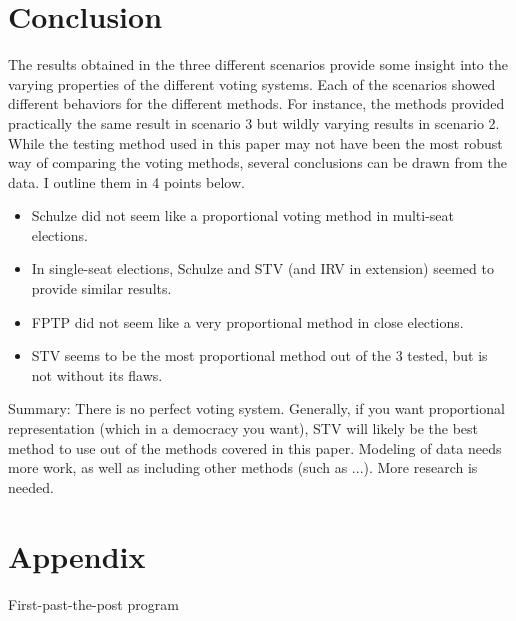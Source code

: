\documentclass[12pt]{article}
\begin{document}
\section{Conclusion}
The results obtained in the three different scenarios provide some insight into the varying properties of the different voting systems. Each of the scenarios showed different behaviors for the different methods. For instance, the methods provided practically the same result in scenario 3 but wildly varying results in scenario 2. While the testing method used in this paper may not have been the most robust way of comparing the voting methods, several conclusions can be drawn from the data. I outline them in 4 points below.
\begin{itemize}
	\item Schulze did not seem like a proportional voting method in multi-seat elections.
	\item In single-seat elections, Schulze and STV (and IRV in extension) seemed to provide similar results.
	\item FPTP did not seem like a very proportional method in close elections.
	\item STV seems to be the most proportional method out of the 3 tested, but is not without its flaws.
\end{itemize}
Summary:
There is no perfect voting system. Generally, if you want proportional representation (which in a democracy you want), STV will likely be the best method to use out of the methods covered in this paper.
Modeling of data needs more work, as well as including other methods (such as ...). More research is needed.

\pagebreak

\printbibliography

\section{Appendix}
First-past-the-post program
\end{document}
